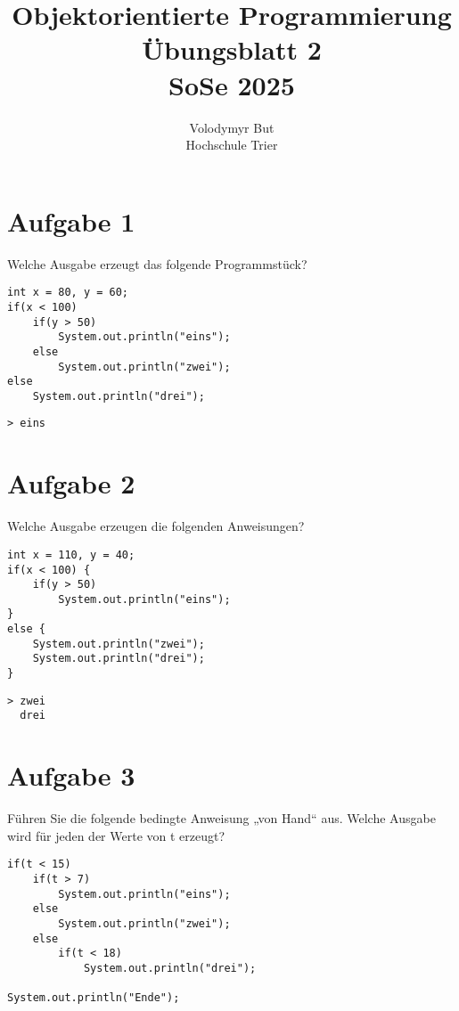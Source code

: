 \documentclass[10pt, oneside]{article}
\title{Objektorientierte Programmierung\\[15pt]\Large{Übungsblatt 2}\\[10pt]\Large{SoSe 2025}}
\author{Volodymyr But\\[10pt]Hochschule Trier}
\date{}
\begin{document}
\maketitle
\vspace{25px}

\section{Aufgabe 1}

Welche Ausgabe erzeugt das folgende Programmstück?

\begin{verbatim}
int x = 80, y = 60;
if(x < 100)
    if(y > 50)
        System.out.println("eins");
    else
        System.out.println("zwei");
else
    System.out.println("drei");
\end{verbatim}

\begin{verbatim}
> eins
\end{verbatim}

\section{Aufgabe 2}

Welche Ausgabe erzeugen die folgenden Anweisungen?

\begin{verbatim}
int x = 110, y = 40;
if(x < 100) {
    if(y > 50)
        System.out.println("eins");
}
else {
    System.out.println("zwei");
    System.out.println("drei");
}
\end{verbatim}

\begin{verbatim}
> zwei
  drei
\end{verbatim}

\pagebreak
\section{Aufgabe 3}

Führen Sie die folgende bedingte Anweisung „von Hand“ aus. Welche Ausgabe wird
für jeden der Werte von t erzeugt?

\begin{verbatim}
if(t < 15)
    if(t > 7)
        System.out.println("eins");
    else
        System.out.println("zwei");
    else
        if(t < 18)
            System.out.println("drei");

System.out.println("Ende");
\end{verbatim}
\end{document}
